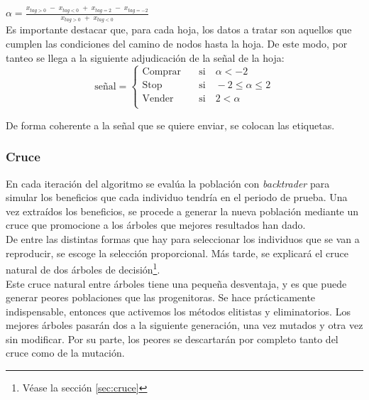 $\alpha = \frac{x_{tag>0}\; -\; x_{tag<0} \; + \; x_{tag=2} \; -\; x_{tag=-2}}{x_{tag>0}\; + \; x_{tag<0}} $\\


Es importante destacar que, para cada hoja, los datos a tratar son aquellos que cumplen las condiciones del camino de nodos hasta la hoja. De este modo, por tanteo se llega a la siguiente adjudicaci\'on de la se\~nal de la hoja:\\

\[   
\text{se\~nal} = 
     \begin{cases}
       \text{Comprar} &\quad\text{si}\quad \alpha < -2\\
       \text{Stop} &\quad\text{si}\quad -2 \leq \alpha \leq 2\\
       \text{Vender} &\quad\text{si}\quad 2 < \alpha\\ 
     \end{cases}
\]

De forma coherente a la se\~nal que se quiere enviar, se colocan las etiquetas.\\

\subsubsection{Cruce}
En cada iteraci\'on del algoritmo se eval\'ua la poblaci\'on con \textit{backtrader} para simular los beneficios que cada individuo tendr\'ia en el periodo de prueba. Una vez extra\'idos los beneficios, se procede a generar la nueva poblaci\'on mediante un cruce que promocione a los \'arboles que mejores resultados han dado.\\

De entre las distintas formas que hay para seleccionar los individuos que se van a reproducir, se escoge la selecci\'on proporcional. M\'as tarde, se explicar\'a el cruce natural de dos \'arboles de decisi\'on\footnote{V\'ease la secci\'on \ref{sec:cruce}}.\\

Este cruce natural entre \'arboles tiene una peque\~na desventaja, y es que puede generar peores poblaciones que las progenitoras. Se hace pr\'acticamente indispensable, entonces que activemos los m\'etodos elitistas y eliminatorios. Los mejores \'arboles pasar\'an dos a la siguiente generaci\'on, una vez mutados y otra vez sin modificar. Por su parte, los peores se descartar\'an por completo tanto del cruce como de la mutaci\'on.\\

